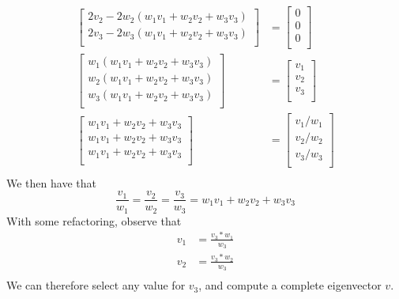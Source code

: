 \begin{align*}
\begin{bmatrix}
        2v_2 -2w_2 (w_1 v_1 + w_2 v_2 + w_3 v_3) \\
        2v_3 -2w_3 (w_1 v_1 + w_2 v_2 + w_3 v_3) \\
    \end{bmatrix} &= \begin{bmatrix}
        0 \\ 0 \\ 0 \\
    \end{bmatrix} \\ 
    \begin{bmatrix}
        w_1 (w_1 v_1 + w_2 v_2 + w_3 v_3) \\
        w_2 (w_1 v_1 + w_2 v_2 + w_3 v_3) \\
        w_3 (w_1 v_1 + w_2 v_2 + w_3 v_3) \\
    \end{bmatrix} &= \begin{bmatrix}
        v_1 \\ v_2 \\ v_3 \\
    \end{bmatrix} \\ 
    \begin{bmatrix}
        w_1 v_1 + w_2 v_2 + w_3 v_3 \\
        w_1 v_1 + w_2 v_2 + w_3 v_3 \\
        w_1 v_1 + w_2 v_2 + w_3 v_3 \\
    \end{bmatrix} &= \begin{bmatrix}
        v_1 / w_1 \\ v_2 / w_2 \\ v_3 / w_3 \\
    \end{bmatrix} \\ 
\end{align*}
We then have that 
\begin{equation*}
    \frac{v_1}{w_1} = \frac{v_2}{w_2} = \frac{v_3}{w_3} = w_1 v_1 + w_2 v_2 + w_3 v_3
\end{equation*}
With some refactoring, observe that
\begin{align*}
    v_1 &= \frac{v_3 * w_1}{w_3} \\
    v_2 &= \frac{v_3 * w_2}{w_3} \\
\end{align*}
We can therefore select any value for $v_3$, and compute a complete eigenvector $v$.

